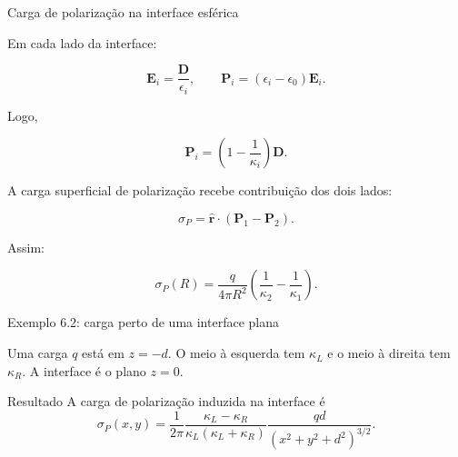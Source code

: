 \documentclass[aspectratio=169]{beamer}
\begin{document}
\begin{frame}{Carga de polarização na interface esférica}

\small

Em cada lado da interface:

\[
\mathbf E_i=\frac{\mathbf D}{\epsilon_i},
\qquad
\mathbf P_i=(\epsilon_i-\epsilon_0)\mathbf E_i.
\]

Logo,

\[
\mathbf P_i
=
\left(1-\frac{1}{\kappa_i}\right)\mathbf D.
\]

A carga superficial de polarização recebe contribuição dos dois lados:

\[
\sigma_P
=
\hat{\mathbf r}\cdot(\mathbf P_1-\mathbf P_2).
\]

Assim:

\begin{eqbox}
\begin{equation}
\sigma_P(R)
=
\frac{q}{4\pi R^2}
\left(
\frac{1}{\kappa_2}
-
\frac{1}{\kappa_1}
\right).
\tag{6.58}
\label{eq:sigma-interface-esferica}
\end{equation}
\end{eqbox}

\end{frame}

\begin{frame}{Exemplo 6.2: carga perto de uma interface plana}

\small

Uma carga \(q\) está em \(z=-d\). O meio à esquerda tem \(\kappa_L\) e o meio à
direita tem \(\kappa_R\). A interface é o plano \(z=0\).

\begin{center}
\end{center}

\begin{mybox}{Resultado}
A carga de polarização induzida na interface é
\[
\sigma_P(x,y)
=
\frac{1}{2\pi}
\frac{\kappa_L-\kappa_R}{\kappa_L(\kappa_L+\kappa_R)}
\frac{qd}{(x^2+y^2+d^2)^{3/2}}.
\]
\end{mybox}

\end{frame}
\end{document}
